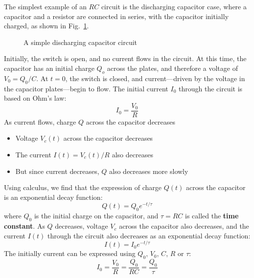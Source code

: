 The simplest example of an $RC$ circuit is the discharging capacitor case,
where a capacitor and a resistor are connected in series, with the capacitor
initially charged, as shown in Fig.~\ref{fig:discharing-capacitor}.
\begin{figure}[ht]
  \centering
  \caption{A simple discharging capacitor circuit}
  \label{fig:discharing-capacitor}
\end{figure}
Initially, the switch is open, and no current flows in the circuit. At this
time, the capacitor has an initial charge $Q_o$ across the plates, and therefore
a voltage of $V_0=Q_0/C$. At $t=0$, the switch is closed, and current---driven
by the voltage in the capacitor plates---begin to flow. The initial current
$I_0$ through the circuit is based on Ohm's law:
\begin{displaymath}
  I_0=\frac{V_0}R
\end{displaymath}
As current flows, charge $Q$ across the capacitor decreases
\begin{itemize}
\item Voltage $V_c(t)$ across the capacitor decreases
\item The current $I(t)=V_c(t)/R$ also decreases
\item But since current decreases, $Q$ also decreases more
  slowly
\end{itemize}

Using calculus, we find that the expression of charge $Q(t)$ across the
capacitor is an exponential decay function:
\begin{equation}
  \boxed{
    Q(t)=Q_0e^{-t/\tau}
  }
\end{equation}  
where $Q_0$ is the initial charge on the capacitor, and $\tau=RC$ is called the
\textbf{time constant}. As $Q$ decreases, voltage $V_c$ across the capacitor
also decreases, and the current $I(t)$ through the circuit also decreases as an
exponential decay function:
\begin{equation}
  \boxed{
    I(t)=I_0e^{-t/\tau}
  }
\end{equation}
The initially current can be expressed using $Q_0$, $V_0$, $C$, $R$ or $\tau$:
\begin{displaymath}
  I_0=\frac{V_0}R=\frac{Q_0}{RC}=\frac{Q_0}\tau
\end{displaymath}



